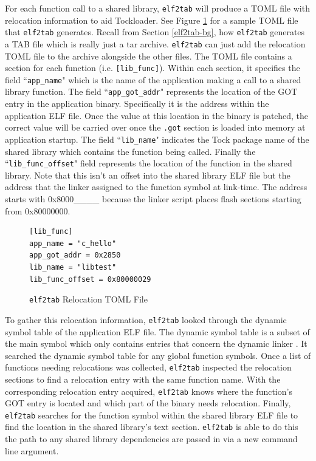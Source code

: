 \documentclass[12pt]{ucsddissertation}
\begin{document}
For each function call to a shared library, \texttt{elf2tab} will produce a TOML file with relocation information to aid Tockloader. See Figure \ref{fig:reloctoml} for a sample TOML file that \texttt{elf2tab} generates. Recall from Section \ref{elf2tab-bg}, how \texttt{elf2tab} generates a TAB file which is really just a tar archive. \texttt{elf2tab} can just add the relocation TOML file to the archive alongside the other files. The TOML file contains a section for each function (i.e. \texttt{[lib\_func]}). Within each section, it specifies the field ``\texttt{app\_name}" which is the name of the application making a call to a shared library function. The field ``\texttt{app\_got\_addr}" represents the location of the GOT entry in the application binary. Specifically it is the address within the application ELF file. Once the value at this location in the binary is patched, the correct value will be carried over once the \texttt{.got} section is loaded into memory at application startup. The field ``\texttt{lib\_name}" indicates the Tock package name of the shared library which contains the function being called. Finally the ``\texttt{lib\_func\_offset}" field represents the location of the function in the shared library. Note that this isn't an offset into the shared library ELF file but the address that the linker assigned to the function symbol at link-time. The address starts with 0x8000\_\_\_\_ because the linker script places flash sections starting from 0x80000000.

\begin{figure}[h!]
\begin{verbatim}
[lib_func]
app_name = "c_hello"
app_got_addr = 0x2850
lib_name = "libtest"
lib_func_offset = 0x80000029
\end{verbatim}
    \caption{\texttt{elf2tab} Relocation TOML File}
    \label{fig:reloctoml}
\end{figure}

To gather this relocation information, \texttt{elf2tab} looked through the dynamic symbol table of the application ELF file. The dynamic symbol table is a subset of the main symbol which only contains entries that concern the dynamic linker \cite{k3-symtab}. It searched the dynamic symbol table for any global function symbols. Once a list of functions needing relocations was collected, \texttt{elf2tab} inspected the relocation sections to find a relocation entry with the same function name. With the corresponding relocation entry acquired, \texttt{elf2tab} knows where the function's GOT entry is located and which part of the binary needs relocation. Finally, \texttt{elf2tab} searches for the function symbol within the shared library ELF file to find the location in the shared library's text section. \texttt{elf2tab} is able to do this the path to any shared library dependencies are passed in via a new command line argument.
\end{document}
